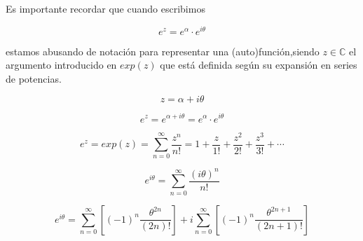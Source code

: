 \documentclass[preview]{standalone}
\begin{document}
\begin{center}
Es importante recordar que cuando  escribimos 

$$e^{z}=e^{\alpha}\cdot e^{i\theta}$$ 

estamos abusando de notación para representar una (auto)función,siendo $z  \in \mathbb{C}$ el argumento introducido en $exp(z)$ que está definida según su expansión en series de potencias. 

$$z = \alpha + i\theta $$

$$e^{z}=e^{\alpha+i\theta}=e^{\alpha}\cdot e^{i\theta}$$

$$e^z=exp(z)=\sum_{n=0}^{\infty} \frac{z^n}{n!} = 1 + \frac{z}{1!} + \frac{z^2}{2!} + \frac{z^3}{3!} + \cdots$$


$$e^{i\theta}= \sum_{n=0}^{\infty} \frac{(i \theta)^n}{n!} $$

$$e^{i\theta}=\sum_{n=0}^{\infty} \left[ \left(-1\right)^n \frac{\theta^{2n}}{(2n)!} \right] + i \sum_{n=0}^{\infty} \left[ \left(-1\right)^n \frac{\theta^{2n+1}}{(2n+1)!} \right]$$
\end{center}
\end{document}
